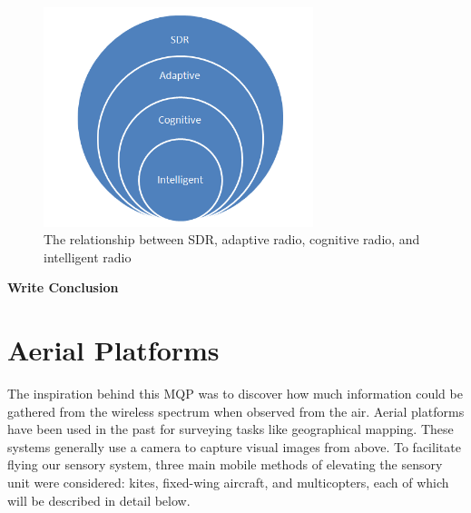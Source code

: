 \begin{figure}[ht]
\centering
\includegraphics[width=0.70\textwidth]{img/sdr_diagram2.png}
\caption{The relationship between SDR, adaptive radio, cognitive radio, and intelligent radio}
\label{fig:sdr_relationship_diagram}
\end{figure}\par
\textbf{Write Conclusion}

\section{Aerial Platforms}
The inspiration behind this MQP was to discover how much information could be gathered from the wireless spectrum when observed from the air. Aerial platforms have been used in the past for surveying tasks like geographical mapping. \cite{geomap_patent} These systems generally use a camera to capture visual images from above. To facilitate flying our sensory system, three main mobile methods of elevating the sensory unit were considered: kites, fixed-wing aircraft, and multicopters, each of which will be described in detail below.

